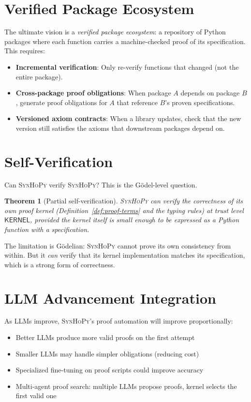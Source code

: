 \documentclass[11pt,a4paper]{report}
\theoremstyle{definition}
\theoremstyle{plain}
\newtheorem{theorem}[definition]{Theorem}
\newcommand{\synhopy}{\textsc{SynHoPy}}
\begin{document}
\section{Verified Package Ecosystem}

The ultimate vision is a \emph{verified package ecosystem}: a repository of
Python packages where each function carries a machine-checked proof of its
specification.  This requires:
\begin{itemize}
  \item \textbf{Incremental verification}: Only re-verify functions that changed
    (not the entire package).
  \item \textbf{Cross-package proof obligations}: When package $A$ depends on
    package $B$, generate proof obligations for $A$ that reference $B$'s
    proven specifications.
  \item \textbf{Versioned axiom contracts}: When a library updates, check that
    the new version still satisfies the axioms that downstream packages depend on.
\end{itemize}

\section{Self-Verification}

Can \synhopy{} verify \synhopy{}?  This is the Gödel-level question.

\begin{theorem}[Partial self-verification]
\synhopy{} can verify the correctness of its own proof kernel
(Definition~\ref{def:proof-terms} and the typing rules) at trust level
$\mathsf{KERNEL}$, provided the kernel itself is small enough to be expressed
as a Python function with a specification.
\end{theorem}

The limitation is Gödelian: \synhopy{} cannot prove its own consistency
from within.  But it \emph{can} verify that its kernel implementation matches
its specification, which is a strong form of correctness.

\section{LLM Advancement Integration}

As LLMs improve, \synhopy{}'s proof automation will improve proportionally:
\begin{itemize}
  \item Better LLMs produce more valid proofs on the first attempt
  \item Smaller LLMs may handle simpler obligations (reducing cost)
  \item Specialized fine-tuning on proof scripts could improve accuracy
  \item Multi-agent proof search: multiple LLMs propose proofs, kernel selects
    the first valid one
\end{itemize}
\end{document}
